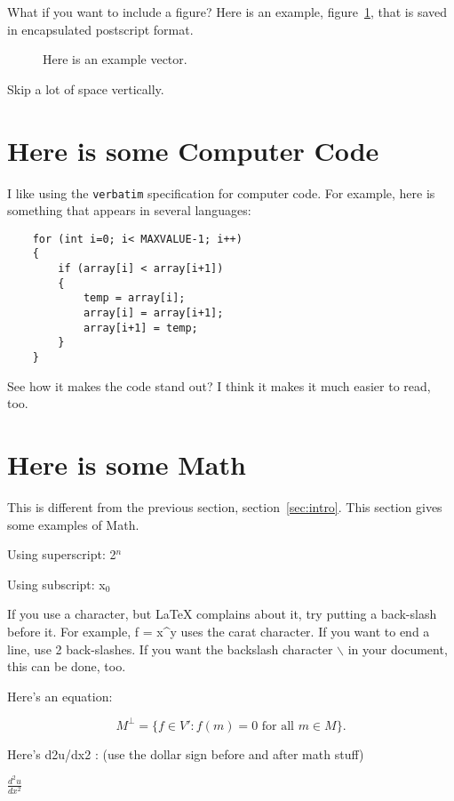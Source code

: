 \documentclass[a4paper, conference]{IEEEconf}
\begin{document}
What if you want to include a figure? 
Here is an example, figure~\ref{fig:phasor1}, that is saved in 
encapsulated postscript format.

\begin{figure}[!hbt]
  \centering
    \scalebox{.9}{}%
  \caption{Here is an example vector.}
  \label{fig:phasor1}
\end{figure}


Skip a lot of space  \bigskip  vertically.

\section{Here is some Computer Code}\label{sec:code}

I like using the \verb"verbatim" specification for computer code. 
For example, here is something that appears in several
languages:

\begin{verbatim}
    for (int i=0; i< MAXVALUE-1; i++)
    {
        if (array[i] < array[i+1]) 
        {
            temp = array[i];
            array[i] = array[i+1];
            array[i+1] = temp;
        }
    }
\end{verbatim}

See how it makes the code stand out? I think it makes it
much easier to read, too.

\section{Here is some Math}\label{sec:math}
This is different from the previous section, section~\ref{sec:intro}.
This section gives some examples of Math.

Using superscript:  2$^{n}$

Using subscript: x$_{0}$

If you use a character, but LaTeX complains about it, try putting a 
back-slash before it. For example, 
f = x\^{}y  uses the carat character. 
If you want to end a line, use 2 back-slashes.
If you want the backslash character $\backslash$ in your document,
this can be done, too.

Here's an equation:

\[ M^\bot = \{ f \in V' : f(m) = 0 \mbox{ for all } m \in M \}.\]

Here's d2u/dx2 : (use the dollar sign before and after math stuff)

$ \frac{d^2 u}{dx^2} $
\end{document}
